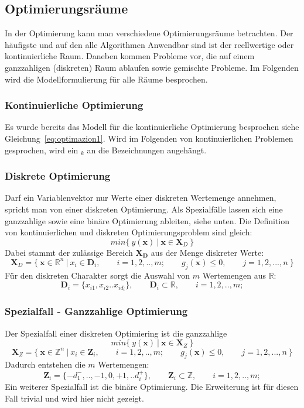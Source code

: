 \subsection{Optimierungsräume}
%
In der Optimierung kann man verschiedene Optimierungsräume betrachten. Der häufigste und auf den alle Algorithmen Anwendbar sind ist der reellwertige oder kontinuierliche Raum. Daneben kommen Probleme vor, die auf einem ganzzahligen (diskreten) Raum ablaufen sowie gemischte Probleme. Im Folgenden wird die Modellformulierung für alle Räume besprochen.
%
\subsubsection{Kontinuierliche Optimierung}
%
Es wurde bereits das Modell für die kontinuierliche Optimierung besprochen siehe Gleichung~\ref{eq:optimazion1}. Wird im Folgenden von kontinuierlichen Problemen gesprochen, wird ein $_k$ an die Bezeichnungen angehängt.
%
\subsubsection{Diskrete Optimierung}
%
Darf ein Variablenvektor nur Werte einer diskreten Wertemenge annehmen, spricht man von einer diskreten Optimierung. Als Spezialfälle lassen sich eine ganzzahlige sowie eine binäre Optimierung ableiten, siehe unten. Die Definition von kontinuierlichen und diskreten Optimierungsproblem sind gleich:
\begin{equation}
	min\{~y(\mathbf{x})~|~\mathbf{x}\in\mathbf{X}_D~\}
\end{equation}
%
Dabei stammt der zulässige Bereich $\mathbf{X_D}$ aus der Menge diskreter Werte:
$$
\mathbf{X}_D=\{~\mathbf{x}\in \mathbb{R}^n~|~x_i\in \mathbf{D}_i,\qquad i=1,2,..,m;\qquad g_j(\mathbf{x})\leq 0, \qquad j=1,2,...,n~\}
$$
Für den diskreten Charakter sorgt die Auswahl von $m$ Wertemengen aus $\mathbb{R}$:
$$
\mathbf{D}_i=\{x_{i1},x_{i2}..x_{id_i}\},\qquad \mathbf{D}_i \subset \mathbb{R},\qquad i=1,2,..,m;
$$
\subsubsection{Spezialfall - Ganzzahlige Optimierung}
%
Der Spezialfall einer diskreten Optimiering ist die ganzzahlige
\begin{equation}
	min\{~y(\mathbf{x})~|~\mathbf{x}\in\mathbf{X}_Z~\}
\end{equation}
%
$$
\mathbf{X}_Z=\{~\mathbf{x}\in \mathbb{Z}^n~|~x_i\in \mathbf{Z}_i,\qquad i=1,2,..,m;\qquad g_j(\mathbf{x})\leq 0, \qquad j=1,2,...,n~\}
$$
Dadurch entstehen die $m$ Wertemengen:
$$
\mathbf{Z}_i=\{-d_1^-,..,-1,0,+1,..d_{i}^+\},\qquad \mathbf{Z}_i \subset \mathbb{Z},\qquad i=1,2,..,m;
$$
Ein weiterer Spezialfall ist die binäre Optimierung. Die Erweiterung ist für diesen Fall trivial und wird hier nicht gezeigt.
%
